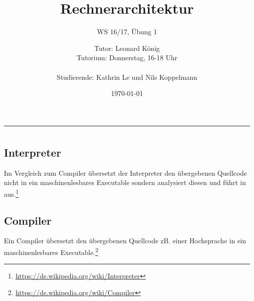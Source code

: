 \documentclass[
	11pt,								%
	parskip=half-,						%
	paper=a4,							%
	english,ngerman,					%
	]{scrartcl}							%
\begin{document}
\begin{titlepage}
	\subject{Jochen Schiller}					%
	\title{Rechnerarchitektur}	%
	\subtitle{\Large WS 16/17, Übung 1}	%
	\author{%
    	Tutor: Leonard König\\			%
        Tutorium: Donnerstag, 16-18 Uhr\\ \\	%
        Studierende: Kathrin Le und Nils Koppelmann}		%
	\date{\normalsize \today}					%
\end{titlepage}


\maketitle								%
\vspace*{-11cm}							%

\vspace{8.2cm}							%
\rule{\linewidth}{0.8pt}				%

\section*{}

\subsection*{Interpreter}
Im Vergleich zum Compiler übersetzt der Interpreter den übergebenen Quellcode nicht in ein maschinenlesbares Executable sondern analysiert diesen und führt in aus.\footnote{\url{https://de.wikipedia.org/wiki/Interpreter}}

\subsection*{Compiler}
Ein Compiler übersetzt den übergebenen Quellcode zB. einer Hochsprache in ein maschinenlesbares Executable.\footnote{\url{https://de.wikipedia.org/wiki/Compiler}}
\end{document}
